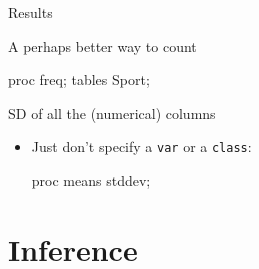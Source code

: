 \documentclass[unknownkeysallowed]{beamer}\usepackage[]{graphicx}\usepackage[]{color}
\begin{document}
\begin{frame}[fragile]{Results}
  
  
  
\end{frame}

\begin{frame}[fragile]{A perhaps better way to count}
  
  \begin{Sascode}[store=sd]
proc freq;
  tables Sport;
  \end{Sascode}
  
  
\end{frame}


\begin{frame}[fragile]{SD of all the (numerical) columns}
  
  \begin{itemize}
  \item Just don't specify a \texttt{var} or a \texttt{class}:
    
    \begin{Sascode}[store=se]
proc means stddev;
    \end{Sascode}
    
  \end{itemize}
  
\end{frame}




\section{Inference}

\frame{\sectionpage}
\end{document}
